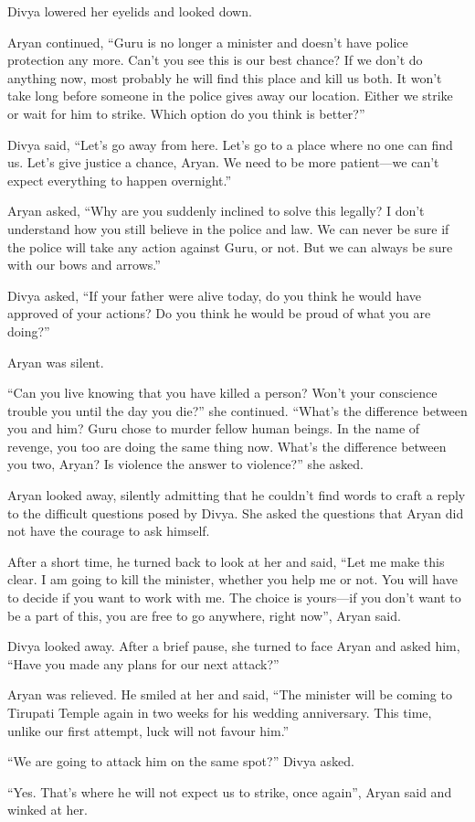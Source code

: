 Divya lowered her eyelids and looked down.

Aryan continued, “Guru is no longer a minister and doesn't have police
protection any more. Can't you see this is our best chance? If we don't do
anything now, most probably he will find this place and kill us both. It won't
take long before someone in the police gives away our location. Either we
strike or wait for him to strike. Which option do you think is better?”

Divya said, “Let's go away from here. Let's go to a place where no one can
find us. Let's give justice a chance, Aryan. We need to be more patient—we
can't expect everything to happen overnight.”

Aryan asked, “Why are you suddenly inclined to solve this legally? I don't
understand how you still believe in the police and law. We can never be sure if
the police will take any action against Guru, or not. But we can always be sure
with our bows and arrows.”

Divya asked, “If your father were alive today, do you think he would have
approved of your actions? Do you think he would be proud of what you are doing?”

Aryan was silent.

“Can you live knowing that you have killed a person? Won't your conscience
trouble you until the day you die?” she continued. “What's the difference
between you and him? Guru chose to murder fellow human beings. In the name of
revenge, you too are doing the same thing now. What's the difference between you
two, Aryan? Is violence the answer to violence?” she asked.

Aryan looked away, silently admitting that he couldn't find words to craft a
reply to the difficult questions posed by Divya. She asked the questions
that Aryan did not have the courage to ask himself.

After a short time, he turned back to look at her and said, “Let me make this
clear. I am going to kill the minister, whether you help me or not. You will have
to decide if you want to work with me. The choice is yours—if you don't
want to be a part of this, you are free to go anywhere, right now”, Aryan said.

Divya looked away. After a brief pause, she turned to face Aryan and asked him,
“Have you made any plans for our next attack?”

Aryan was relieved. He smiled at her and said, “The minister will be coming to
Tirupati Temple again in two weeks for his wedding anniversary. This time,
unlike our first attempt, luck will not favour him.”

“We are going to attack him on the same spot?” Divya asked.

“Yes. That's where he will not expect us to strike, once again”, Aryan said and
winked at her.